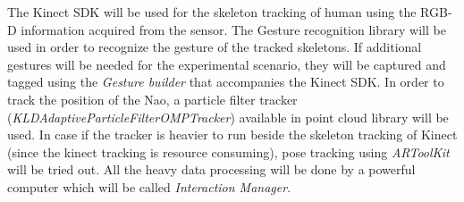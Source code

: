 The Kinect SDK will be used for the skeleton tracking of human using the RGB-D information acquired from the sensor. The Gesture recognition library will be used in order to recognize the gesture of the tracked skeletons. If additional gestures will be needed for the experimental scenario, they will be captured and tagged using the \emph{Gesture builder} that accompanies the Kinect SDK. In order to track the position of the Nao, a particle filter tracker (\emph{KLDAdaptiveParticleFilterOMPTracker}) available in point cloud library will be used. In case if the tracker is heavier to run beside the skeleton tracking of Kinect (since the kinect tracking is resource consuming), pose tracking using \emph{ARToolKit} will be tried out. All the heavy data processing will be done by a powerful computer which will be called \emph{Interaction Manager}. 

